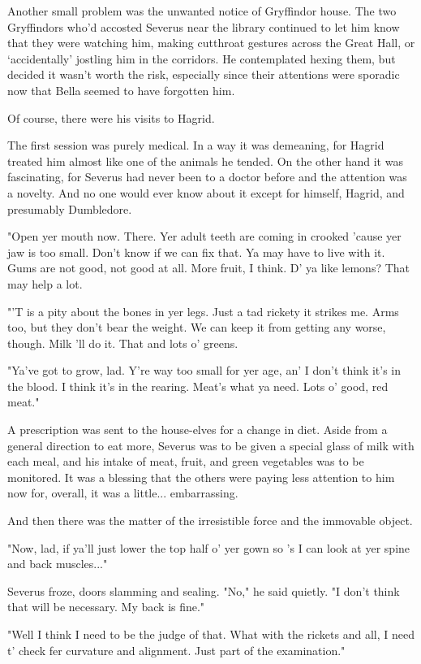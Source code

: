 \documentclass[a4paper,11pt]{article}
\begin{document}
Another small problem was the unwanted notice of Gryffindor house. The two Gryffindors who'd accosted Severus near the library continued to let him know that they were watching him, making cutthroat gestures across the Great Hall, or `accidentally' jostling him in the corridors. He contemplated hexing them, but decided it wasn't worth the risk, especially since their attentions were sporadic now that Bella seemed to have forgotten him.

Of course, there were his visits to Hagrid.

The first session was purely medical. In a way it was demeaning, for Hagrid treated him almost like one of the animals he tended. On the other hand it was fascinating, for Severus had never been to a doctor before and the attention was a novelty. And no one would ever know about it except for himself, Hagrid, and presumably Dumbledore.

"Open yer mouth now. There. Yer adult teeth are coming in crooked 'cause yer jaw is too small. Don't know if we can fix that. Ya may have to live with it. Gums are not good, not good at all. More fruit, I think. D' ya like lemons? That may help a lot.

"'T is a pity about the bones in yer legs. Just a tad rickety it strikes me. Arms too, but they don't bear the weight. We can keep it from getting any worse, though. Milk 'll do it. That and lots o' greens.

"Ya've got to grow, lad. Y're way too small for yer age, an' I don't think it's in the blood. I think it's in the rearing. Meat's what ya need. Lots o' good, red meat."

A prescription was sent to the house-elves for a change in diet. Aside from a general direction to eat more, Severus was to be given a special glass of milk with each meal, and his intake of meat, fruit, and green vegetables was to be monitored. It was a blessing that the others were paying less attention to him now for, overall, it was a little... embarrassing.

And then there was the matter of the irresistible force and the immovable object.

"Now, lad, if ya'll just lower the top half o' yer gown so 's I can look at yer spine and back muscles..."

Severus froze, doors slamming and sealing. "No," he said quietly. "I don't think that will be necessary. My back is fine."

"Well I think I need to be the judge of that. What with the rickets and all, I need t' check fer curvature and alignment. Just part of the examination."
\end{document}
